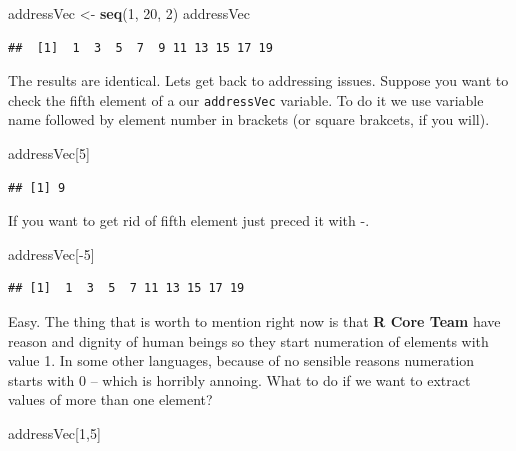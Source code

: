 \documentclass[]{book}
\newenvironment{Shaded}{\begin{snugshade}}{\end{snugshade}}
\newcommand{\KeywordTok}[1]{\textcolor[rgb]{0.12,0.11,0.11}{\textbf{#1}}}
\newcommand{\DecValTok}[1]{\textcolor[rgb]{0.69,0.50,0.00}{#1}}
\newcommand{\StringTok}[1]{\textcolor[rgb]{0.75,0.01,0.01}{#1}}
\newcommand{\OperatorTok}[1]{\textcolor[rgb]{0.12,0.11,0.11}{#1}}
\newcommand{\NormalTok}[1]{\textcolor[rgb]{0.12,0.11,0.11}{#1}}
\theoremstyle{definition}
\theoremstyle{definition}
\theoremstyle{definition}
\theoremstyle{remark}
\begin{document}
\begin{Shaded}
\begin{Highlighting}[]
\NormalTok{addressVec <-}\StringTok{ }\KeywordTok{seq}\NormalTok{(}\DecValTok{1}\NormalTok{, }\DecValTok{20}\NormalTok{, }\DecValTok{2}\NormalTok{)}
\NormalTok{addressVec}
\end{Highlighting}
\end{Shaded}

\begin{verbatim}
##  [1]  1  3  5  7  9 11 13 15 17 19
\end{verbatim}

The results are identical. Lets get back to addressing issues. Suppose
you want to check the fifth element of a our \texttt{addressVec}
variable. To do it we use variable name followed by element number in
brackets (or square brakcets, if you will).

\begin{Shaded}
\begin{Highlighting}[]
\NormalTok{addressVec[}\DecValTok{5}\NormalTok{]}
\end{Highlighting}
\end{Shaded}

\begin{verbatim}
## [1] 9
\end{verbatim}

If you want to get rid of fifth element just preced it with -.

\begin{Shaded}
\begin{Highlighting}[]
\NormalTok{addressVec[}\OperatorTok{-}\DecValTok{5}\NormalTok{]}
\end{Highlighting}
\end{Shaded}

\begin{verbatim}
## [1]  1  3  5  7 11 13 15 17 19
\end{verbatim}

Easy. The thing that is worth to mention right now is that \textbf{R
Core Team} have reason and dignity of human beings so they start
numeration of elements with value 1. In some other languages, because of
no sensible reasons numeration starts with 0 -- which is horribly
annoing. What to do if we want to extract values of more than one
element?

\begin{Shaded}
\begin{Highlighting}[]
\NormalTok{addressVec[}\DecValTok{1}\NormalTok{,}\DecValTok{5}\NormalTok{]}
\end{Highlighting}
\end{Shaded}
\end{document}
